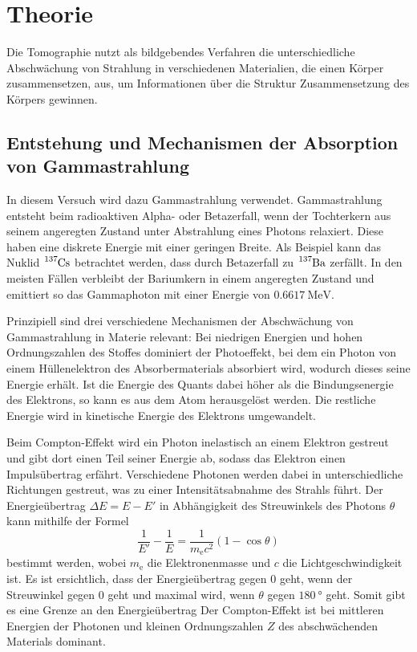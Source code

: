 \section{Theorie}
\label{sec:Theorie}

Die Tomographie nutzt als bildgebendes Verfahren die unterschiedliche Abschwächung von Strahlung in verschiedenen Materialien, die einen Körper zusammensetzen, aus, um Informationen über die Struktur Zusammensetzung des Körpers gewinnen.

\subsection{Entstehung und Mechanismen der Absorption von Gammastrahlung}
\label{subsec:theorie1}

In diesem Versuch wird dazu Gammastrahlung verwendet. Gammastrahlung entsteht beim radioaktiven Alpha- oder Betazerfall, wenn der Tochterkern aus seinem angeregten Zustand unter Abstrahlung eines Photons relaxiert. Diese haben eine diskrete Energie mit einer geringen Breite.
Als Beispiel kann das Nuklid $\ce{^{137}Cs}$ betrachtet werden, dass durch Betazerfall zu $\ce{^{137}Ba}$ zerfällt. In den meisten Fällen verbleibt der Bariumkern in einem angeregten Zustand und emittiert so das Gammaphoton mit einer Energie von $\SI{0.6617}{\mega\electronvolt}$.

Prinzipiell sind drei verschiedene Mechanismen der Abschwächung von Gammastrahlung in Materie relevant: Bei niedrigen Energien und hohen Ordnungszahlen des Stoffes dominiert der Photoeffekt, bei dem ein Photon von einem Hüllenelektron des Absorbermaterials
absorbiert wird, wodurch dieses seine Energie erhält. Ist die Energie des Quants dabei höher als die Bindungsenergie des Elektrons, so kann es aus dem Atom herausgelöst werden. Die restliche Energie wird in kinetische Energie des Elektrons umgewandelt.

Beim Compton-Effekt wird ein Photon inelastisch an einem Elektron gestreut und gibt dort einen Teil seiner Energie ab, sodass das Elektron einen Impulsübertrag erfährt.
Verschiedene Photonen werden dabei in unterschiedliche Richtungen gestreut, was zu einer Intensitätsabnahme
des Strahls führt.
Der Energieübertrag $\Delta E = E - E'$ in Abhängigkeit des Streuwinkels des Photons $\theta$ kann mithilfe der Formel
\begin{equation}
	\frac{1}{E'} - \frac{1}{E} = \frac{1}{m_\text{e} c^2} (1-\cos\theta)
\end{equation}
bestimmt werden, wobei $m_\text{e}$ die Elektronenmasse und $c$ die Lichtgeschwindigkeit ist. Es ist ersichtlich, dass der Energieübertrag gegen 0 geht, wenn der Streuwinkel gegen 0 geht und maximal wird, wenn $\theta$ gegen $\SI{180}{\degree}$ geht. Somit gibt es eine Grenze an den Energieübertrag
Der Compton-Effekt ist bei mittleren Energien der Photonen und kleinen Ordnungszahlen $Z$ des abschwächenden Materials dominant.

